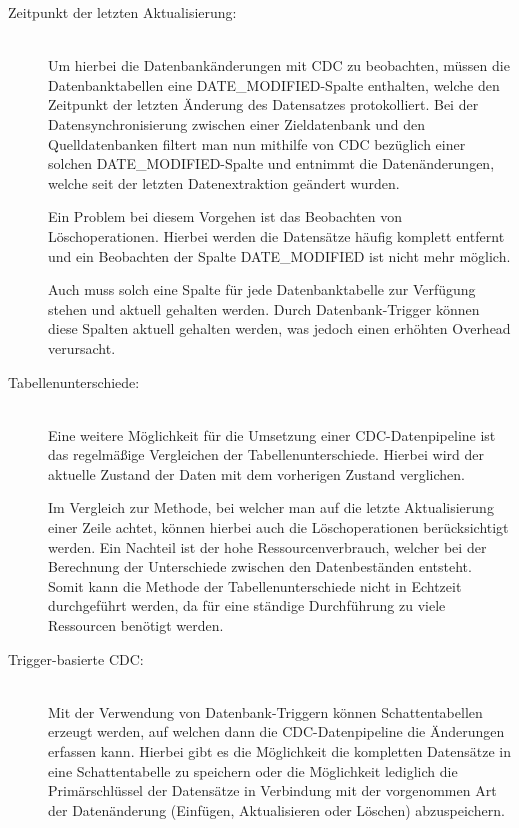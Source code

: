 \begin{description}
    \item[Zeitpunkt der letzten Aktualisierung:]\hfill \\
    Um hierbei die Datenbankänderungen mit CDC zu beobachten, müssen die Datenbanktabellen eine \glqq DATE\_MODIFIED\grqq{}-Spalte enthalten, welche den Zeitpunkt der letzten Änderung des Datensatzes protokolliert. Bei der Datensynchronisierung zwischen einer Zieldatenbank und den Quelldatenbanken filtert man nun mithilfe von CDC bezüglich einer solchen \glqq DATE\_MODIFIED\grqq{}-Spalte und entnimmt die Datenänderungen, welche seit der letzten Datenextraktion geändert wurden.

    Ein Problem bei diesem Vorgehen ist das Beobachten von Löschoperationen. Hierbei werden die Datensätze häufig komplett entfernt und ein Beobachten der Spalte \glqq DATE\_MODIFIED\grqq{} ist nicht mehr möglich.

    Auch muss solch eine Spalte für jede Datenbanktabelle zur Verfügung stehen und aktuell gehalten werden. Durch Datenbank-Trigger können diese Spalten aktuell gehalten werden, was jedoch einen erhöhten Overhead verursacht.

    \item[Tabellenunterschiede:]\hfill \\
    Eine weitere Möglichkeit für die Umsetzung einer CDC-Datenpipeline ist das regelmäßige Vergleichen der Tabellenunterschiede. Hierbei wird der aktuelle Zustand der Daten mit dem vorherigen Zustand verglichen.

    Im Vergleich zur Methode, bei welcher man auf die letzte Aktualisierung einer Zeile achtet, können hierbei auch die Löschoperationen berücksichtigt werden. Ein Nachteil ist der hohe Ressourcenverbrauch, welcher bei der Berechnung der Unterschiede zwischen den Datenbeständen entsteht. Somit kann die Methode der Tabellenunterschiede nicht in Echtzeit durchgeführt werden, da für eine ständige Durchführung zu viele Ressourcen benötigt werden.

    \item[Trigger-basierte CDC:]\hfill \\
    Mit der Verwendung von Datenbank-Triggern können Schattentabellen erzeugt werden, auf welchen dann die CDC-Datenpipeline die Änderungen erfassen kann. Hierbei gibt es die Möglichkeit die kompletten Datensätze in eine Schattentabelle zu speichern oder die Möglichkeit lediglich die Primärschlüssel der Datensätze in Verbindung mit der vorgenommen Art der Datenänderung (Einfügen, Aktualisieren oder Löschen) abzuspeichern.


\end{description}
